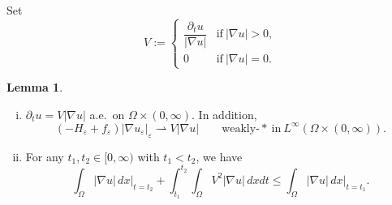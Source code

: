 \documentclass{amsart}
\theoremstyle{definition}
\newtheorem{lemma}[definition]{Lemma}
\begin{document}
Set 
\begin{equation}\label{velocity}
V := \begin{cases}
\dfrac{ \partial_t u }{|\nabla u |} & \text{if} \ |\nabla u|>0,\\
0 & \text{if} \ |\nabla u| =0.
\end{cases}
\end{equation}

\begin{lemma}\label{lem:3.2}
\begin{enumerate}[(i)]
\item \label{lem:3.2(i)}$\partial _t u = V|\nabla u|$ a.e.\ on $\Omega \times (0,\infty)$.
In addition, 
\begin{equation}\label{eq:40}
( -H_\varepsilon + f_\varepsilon) |\nabla u_\varepsilon|_\varepsilon
\rightharpoonup V|\nabla u|
\qquad 
\text{weakly-}\ast \ \text{in} \ L^\infty (\Omega \times (0,\infty)).
\end{equation}
\item\label{lem:3.2(ii)} For any $t_1, t_2 \in [0,\infty)$ with $t_1 <t_2$, we have
\begin{equation}\label{energy-ineq}
\int_{\Omega} |\nabla u| \, dx
\Big | _{t=t_2}
+
\int_{t_1} ^{t_2} \int_\Omega V^2 |\nabla u| \, dxdt \leq 
\int_{\Omega} |\nabla u| \, dx
\Big | _{t=t_1}.
\end{equation}
\end{enumerate}
\end{lemma}
\end{document}

